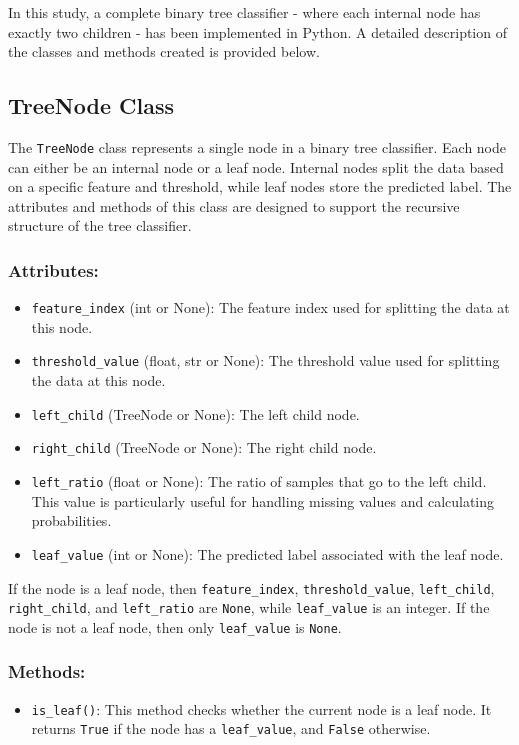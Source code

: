 \documentclass{article}
\begin{document}
In this study, a complete binary tree classifier - where each internal node has exactly two children - has been implemented in Python. A detailed description of the classes and methods created is provided below.

\subsection{TreeNode Class}

The \texttt{TreeNode} class represents a single node in a binary tree classifier. Each node can either be an internal node or a leaf node. Internal nodes split the data based on a specific feature and threshold, while leaf nodes store the predicted label. The attributes and methods of this class are designed to support the recursive structure of the tree classifier.

\subsubsection*{Attributes:}
\begin{itemize}
    \item \texttt{feature\_index} (int or None): The feature index used for splitting the data at this node.
    \item \texttt{threshold\_value} (float, str or None): The threshold value used for splitting the data at this node.
    \item \texttt{left\_child} (TreeNode or None): The left child node.
    \item \texttt{right\_child} (TreeNode or None): The right child node.
    \item \texttt{left\_ratio} (float or None): The ratio of samples that go to the left child. This value is particularly useful for handling missing values and calculating probabilities.
    \item \texttt{leaf\_value} (int or None): The predicted label associated with the leaf node.
\end{itemize}

\noindent If the node is a leaf node, then \texttt{feature\_index}, \texttt{threshold\_value}, \texttt{left\_child}, \texttt{right\_child}, and \texttt{left\_ratio} are \texttt{None}, while \texttt{leaf\_value} is an integer. If the node is not a leaf node, then only \texttt{leaf\_value} is \texttt{None}.

\subsubsection*{Methods:}
\begin{itemize}
    \item \texttt{is\_leaf()}: This method checks whether the current node is a leaf node. It returns \texttt{True} if the node has a \texttt{leaf\_value}, and \texttt{False} otherwise.
\end{itemize}
\end{document}
